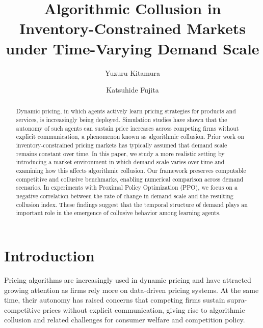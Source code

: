 \documentclass[runningheads]{llncs}
\begin{document}
%
%
\title{Algorithmic Collusion in Inventory-Constrained Markets under Time-Varying Demand Scale}
%
%
\author{Yuzuru Kitamura\and
Katsuhide Fujita}
%
%
\maketitle              %

%
\begin{abstract}
Dynamic pricing, in which agents actively learn pricing strategies for products and services, is increasingly being deployed. Simulation studies have shown that the autonomy of such agents can sustain price increases across competing firms without explicit communication, a phenomenon known as algorithmic collusion. Prior work on inventory-constrained pricing markets has typically assumed that demand scale remains constant over time. In this paper, we study a more realistic setting by introducing a market environment in which demand scale varies over time and examining how this affects algorithmic collusion. Our framework preserves computable competitive and collusive benchmarks, enabling numerical comparison across demand scenarios. In experiments with Proximal Policy Optimization (PPO), we focus on a negative correlation between the rate of change in demand scale and the resulting collusion index. These findings suggest that the temporal structure of demand plays an important role in the emergence of collusive behavior among learning agents.

\end{abstract}
%
%
\section{Introduction}
Pricing algorithms are increasingly used in dynamic pricing and have attracted growing attention as firms rely more on data-driven pricing systems\cite{Chen2016}. At the same time, their autonomy has raised concerns that competing firms sustain supra-competitive prices without explicit communication, giving rise to algorithmic collusion and related challenges for consumer welfare and competition policy\cite{mehra2016,ezrachi2017,harrington2019}.
\end{document}
